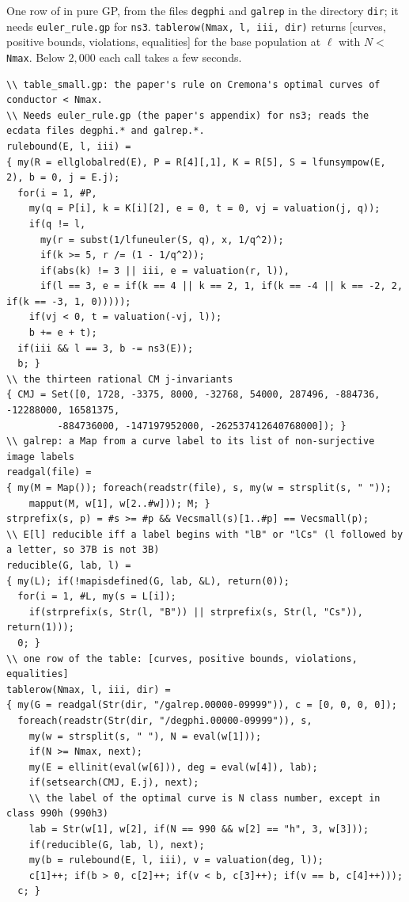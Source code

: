 \begin{sloppypar}
\begin{construction}\label{con:computation:table-small}
One row of  in pure GP, from the files \texttt{degphi} and \texttt{galrep} in the directory \texttt{dir}; it needs
\texttt{euler\_rule.gp} for \texttt{ns3}. \texttt{tablerow(Nmax, l, iii, dir)} returns [curves, positive bounds, violations, equalities] for the base
population at $\ell$ with $N<$ \texttt{Nmax}. Below $2{,}000$ each call takes a few seconds.
\begin{lstlisting}[language=GP,basicstyle=\ttfamily\scriptsize]
\\ table_small.gp: the paper's rule on Cremona's optimal curves of conductor < Nmax.
\\ Needs euler_rule.gp (the paper's appendix) for ns3; reads the ecdata files degphi.* and galrep.*.
rulebound(E, l, iii) =
{ my(R = ellglobalred(E), P = R[4][,1], K = R[5], S = lfunsympow(E, 2), b = 0, j = E.j);
  for(i = 1, #P,
    my(q = P[i], k = K[i][2], e = 0, t = 0, vj = valuation(j, q));
    if(q != l,
      my(r = subst(1/lfuneuler(S, q), x, 1/q^2));
      if(k >= 5, r /= (1 - 1/q^2));
      if(abs(k) != 3 || iii, e = valuation(r, l)),
      if(l == 3, e = if(k == 4 || k == 2, 1, if(k == -4 || k == -2, 2, if(k == -3, 1, 0)))));
    if(vj < 0, t = valuation(-vj, l));
    b += e + t);
  if(iii && l == 3, b -= ns3(E));
  b; }
\\ the thirteen rational CM j-invariants
{ CMJ = Set([0, 1728, -3375, 8000, -32768, 54000, 287496, -884736, -12288000, 16581375,
         -884736000, -147197952000, -262537412640768000]); }
\\ galrep: a Map from a curve label to its list of non-surjective image labels
readgal(file) =
{ my(M = Map()); foreach(readstr(file), s, my(w = strsplit(s, " "));
    mapput(M, w[1], w[2..#w])); M; }
strprefix(s, p) = #s >= #p && Vecsmall(s)[1..#p] == Vecsmall(p);
\\ E[l] reducible iff a label begins with "lB" or "lCs" (l followed by a letter, so 37B is not 3B)
reducible(G, lab, l) =
{ my(L); if(!mapisdefined(G, lab, &L), return(0));
  for(i = 1, #L, my(s = L[i]);
    if(strprefix(s, Str(l, "B")) || strprefix(s, Str(l, "Cs")), return(1)));
  0; }
\\ one row of the table: [curves, positive bounds, violations, equalities]
tablerow(Nmax, l, iii, dir) =
{ my(G = readgal(Str(dir, "/galrep.00000-09999")), c = [0, 0, 0, 0]);
  foreach(readstr(Str(dir, "/degphi.00000-09999")), s,
    my(w = strsplit(s, " "), N = eval(w[1]));
    if(N >= Nmax, next);
    my(E = ellinit(eval(w[6])), deg = eval(w[4]), lab);
    if(setsearch(CMJ, E.j), next);
    \\ the label of the optimal curve is N class number, except in class 990h (990h3)
    lab = Str(w[1], w[2], if(N == 990 && w[2] == "h", 3, w[3]));
    if(reducible(G, lab, l), next);
    my(b = rulebound(E, l, iii), v = valuation(deg, l));
    c[1]++; if(b > 0, c[2]++; if(v < b, c[3]++); if(v == b, c[4]++)));
  c; }
\end{lstlisting}
\end{construction}


\end{sloppypar}

